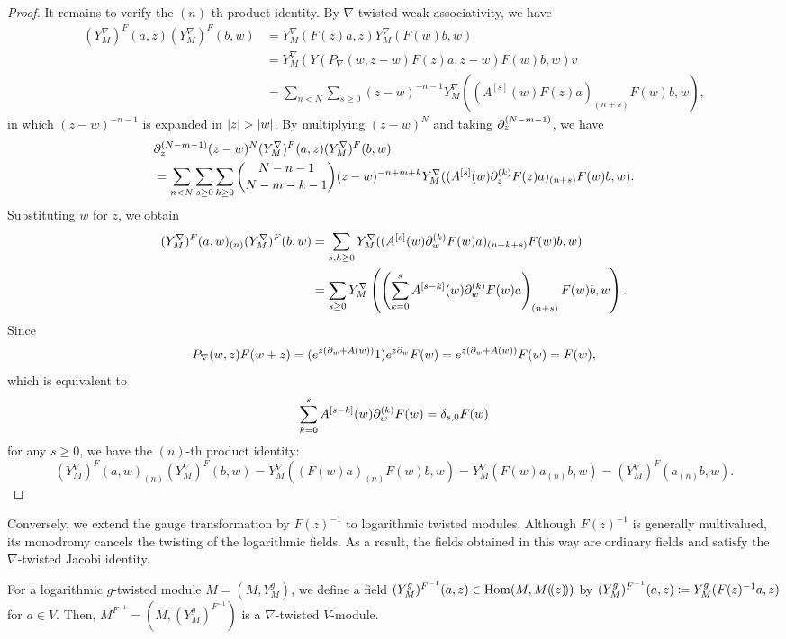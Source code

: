 \documentclass[final,reqno]{amsart}
\begin{document}
\begin{proof}
    It remains to verify the $(n)$-th product identity. By $\nabla$-twisted weak associativity, we have
    \begin{align*}
        (Y^\nabla_M)^F(a,z)(Y^\nabla_M)^F(b,w)
        &=Y^\nabla_M(F(z)a,z)Y^\nabla_M(F(w)b,w)\\
        &=Y^\nabla_M(Y(P_\nabla(w,z-w)F(z)a,z-w)F(w)b,w)v\\
        &=\sum_{n<N}\sum_{s\geq 0}(z-w)^{-n-1}Y^\nabla_M((A^{[s]}(w)F(z)a)_{(n+s)}F(w)b,w),
    \end{align*} 
    in which $(z-w)^{-n-1}$ is expanded in $\abs{z}>\abs{w}$. By multiplying $(z-w)^N$ and taking $\partial_z^{(N-m-1)}$, we have
    \begin{align*}
        &\partial_z^{(N-m-1)}(z-w)^N(Y^\nabla_M)^F(a,z)(Y^\nabla_M)^F(b,w)\\
        &=\sum_{n<N}\sum_{s\geq 0}\sum_{k\geq 0}\binom{N-n-1}{N-m-k-1}(z-w)^{-n+m+k}Y^\nabla_M((A^{[s]}(w)\partial_z^{(k)}F(z)a)_{(n+s)}F(w)b,w).
    \end{align*}
    Substituting $w$ for $z$, we obtain
    \begin{align*}
        (Y^\nabla_M)^F(a,w)_{(n)}(Y^\nabla_M)^F(b,w)
        &=\sum_{s,k\geq 0}Y^\nabla_M((A^{[s]}(w)\partial_w^{(k)}F(w)a)_{(n+k+s)}F(w)b,w)\\
        &=\sum_{s\geq 0}Y^\nabla_M\left(\left(\sum_{k=0}^sA^{[s-k]}(w)\partial_w^{(k)}F(w)a\right)_{(n+s)}F(w)b,w\right).
     \end{align*}
     Since
     \[
        P_\nabla(w,z)F(w+z)=(e^{z(\partial_w+A(w))}1)e^{z\partial_w}F(w)=e^{z(\partial_w+A(w))}F(w)=F(w),
     \]
     which is equivalent to  
     \[
        \sum_{k=0}^sA^{[s-k]}(w)\partial^{(k)}_wF(w)=\delta_{s,0}F(w)
    \]
    for any $s\geq 0$, we have the $(n)$-th product identity:
     \[
        (Y^\nabla_M)^F(a,w)_{(n)}(Y^\nabla_M)^F(b,w)=Y^\nabla_M((F(w)a)_{(n)}F(w)b,w)=Y^\nabla_M(F(w)a_{(n)}b,w)=(Y^\nabla_M)^F(a_{(n)}b,w).
     \]
     \end{proof}

Conversely, we extend the gauge transformation by $F(z)^{-1}$ to logarithmic twisted modules. Although $F(z)^{-1}$ is generally multivalued, its monodromy cancels the twisting of the logarithmic fields. As a result, the fields obtained in this way are ordinary fields and satisfy the $\nabla$-twisted Jacobi identity.
\begin{thm}\label{thm:log tw mod to conn tw mod}
    For a logarithmic $g$-twisted module $M=(M,Y^g_M)$, we define a field $(Y^g_M)^{F^{-1}}(a,z)\in\operatorname{Hom}(M,M(\!( z )\!))$ by $(Y^g_M)^{F^{-1}}(a,z)\coloneqq Y^g_M(F(z)^{-1}a,z)$ for $a\in V$. Then, $M^{F^{-1}}=(M,(Y^g_M)^{F^{-1}})$ is a $\nabla$-twisted $V$-module.
\end{thm}
\end{document}
